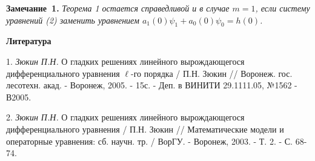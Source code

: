 \textbf{Замечание~1.} {\it Теорема 1 остается справедливой и в случае $m=1$, если систему уравнений (2) заменить уравнением $a_1(0)\psi_1+a_0(0)\psi_0=h(0)$.}



\smallskip \centerline{\bf Литература}\nopagebreak

1. {\it Зюкин П.Н.} О гладких решениях линейного вырождающегося дифференциального уравнения $\ell$-го порядка / П.Н. Зюкин // Воронеж. гос. лесотехн. акад. - Воронеж, 2005. - 15с. - Деп. в ВИНИТИ 29.1111.05, №1562 - В2005.

2. {\it Зюкин П.Н.} О гладких решениях линейного вырождающегося дифференциального уравнения / П.Н. Зюкин // Математические модели и операторные уравнения: сб. научн. тр. / ВорГУ. - Воронеж, 2003. - Т. 2. - С. 68-74.

